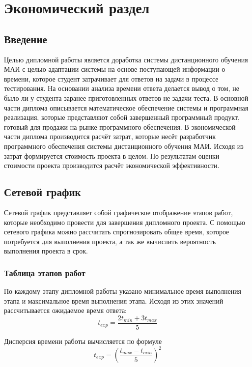  \chapter{Экономический раздел}

 \section{Введение}

 Целью дипломной работы является доработка системы дистанционного обучения МАИ с целью адаптации системы на основе поступающей информа\-ции о времени, которое студент затрачивает для ответов на задачи в процессе тестирования. На основании анализа времени ответа делается вывод о том, не было ли у студента заранее приготовленных ответов не задачи теста.
В основной части диплома описывается математическое обеспечение системы и программная реализация, которые представляют собой завершенный прог\-раммный продукт, готовый для продажи на рынке программного обеспечения.
В экономической части диплома производится расчёт затрат, которые несёт разработчик программного обеспечения системы дистанционного обучения МАИ. Исходя из затрат формируется стоимость проекта в целом. По результа\-там оценки стоимости проекта производится расчёт экономической эффектив\-ности.

\section{Сетевой график}

Сетевой график представляет собой графическое отображение этапов ра\-бот, которые необходимо провести для завершения дипломного проекта. С помощью сетевого графика можно рассчитать спрогнозировать общее время, которое потребуется для выпол\-нения проекта, а так же вычислить вероят\-ность выпол\-нения проекта в срок.

\subsection{Таблица этапов работ}
По каждому этапу дипломной работы указано минимальное время выпол\-нения этапа и максимальное время выпол\-нения этапа. Исходя из этих зна\-чений рассчитывается ожидаемое время ответа:
$$
t_{exp} = \frac{2t_{min}+3t_{max}}{5}
$$

Дисперсия времени работы вычисляется по формуле
$$
t_{exp} = \left( \frac{t_{max} - t_{min}}{5} \right)^2
$$

